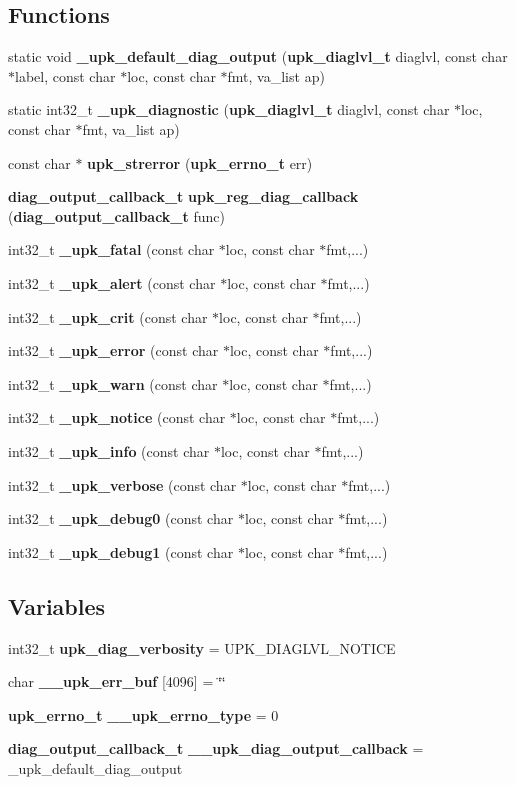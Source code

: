 \subsection*{Functions}
\begin{DoxyCompactItemize}
\item 
static void {\bf \_\-upk\_\-default\_\-diag\_\-output} ({\bf upk\_\-diaglvl\_\-t} diaglvl, const char $\ast$label, const char $\ast$loc, const char $\ast$fmt, va\_\-list ap)
\item 
static int32\_\-t {\bf \_\-upk\_\-diagnostic} ({\bf upk\_\-diaglvl\_\-t} diaglvl, const char $\ast$loc, const char $\ast$fmt, va\_\-list ap)
\item 
const char $\ast$ {\bf upk\_\-strerror} ({\bf upk\_\-errno\_\-t} err)
\item 
{\bf diag\_\-output\_\-callback\_\-t} {\bf upk\_\-reg\_\-diag\_\-callback} ({\bf diag\_\-output\_\-callback\_\-t} func)
\item 
int32\_\-t {\bf \_\-upk\_\-fatal} (const char $\ast$loc, const char $\ast$fmt,...)
\item 
int32\_\-t {\bf \_\-upk\_\-alert} (const char $\ast$loc, const char $\ast$fmt,...)
\item 
int32\_\-t {\bf \_\-upk\_\-crit} (const char $\ast$loc, const char $\ast$fmt,...)
\item 
int32\_\-t {\bf \_\-upk\_\-error} (const char $\ast$loc, const char $\ast$fmt,...)
\item 
int32\_\-t {\bf \_\-upk\_\-warn} (const char $\ast$loc, const char $\ast$fmt,...)
\item 
int32\_\-t {\bf \_\-upk\_\-notice} (const char $\ast$loc, const char $\ast$fmt,...)
\item 
int32\_\-t {\bf \_\-upk\_\-info} (const char $\ast$loc, const char $\ast$fmt,...)
\item 
int32\_\-t {\bf \_\-upk\_\-verbose} (const char $\ast$loc, const char $\ast$fmt,...)
\item 
int32\_\-t {\bf \_\-upk\_\-debug0} (const char $\ast$loc, const char $\ast$fmt,...)
\item 
int32\_\-t {\bf \_\-upk\_\-debug1} (const char $\ast$loc, const char $\ast$fmt,...)
\end{DoxyCompactItemize}
\subsection*{Variables}
\begin{DoxyCompactItemize}
\item 
int32\_\-t {\bf upk\_\-diag\_\-verbosity} = UPK\_\-DIAGLVL\_\-NOTICE
\item 
char {\bf \_\-\_\-upk\_\-err\_\-buf} [4096] = \char`\"{}\char`\"{}
\item 
{\bf upk\_\-errno\_\-t} {\bf \_\-\_\-upk\_\-errno\_\-type} = 0
\item 
{\bf diag\_\-output\_\-callback\_\-t} {\bf \_\-\_\-upk\_\-diag\_\-output\_\-callback} = \_\-upk\_\-default\_\-diag\_\-output
\end{DoxyCompactItemize}


